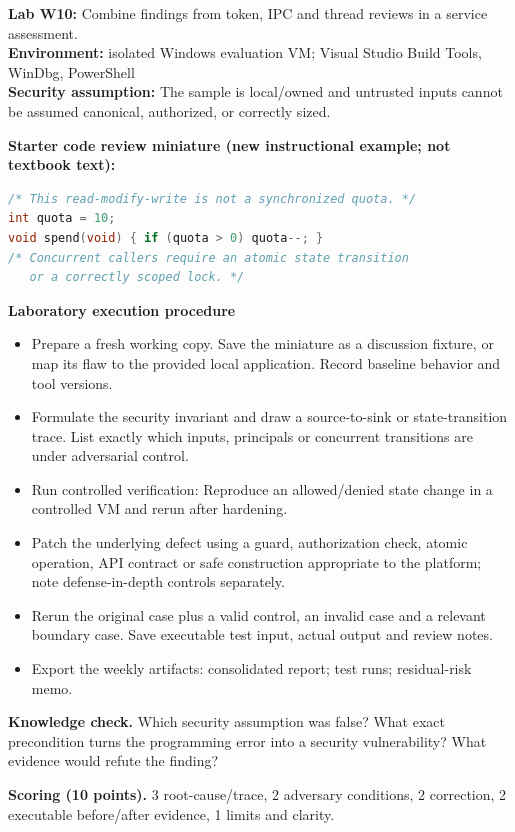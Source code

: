 \documentclass[10pt,letterpaper]{article}
\begin{document}
\begin{insight}\textbf{Lab W10:} Combine findings from token, IPC and thread reviews in a service assessment.\\\textbf{Environment:} isolated Windows evaluation VM; Visual Studio Build Tools, WinDbg, PowerShell\\\textbf{Security assumption:} The sample is local/owned and untrusted inputs cannot be assumed canonical, authorized, or correctly sized.\end{insight}
\textbf{Starter code review miniature (new instructional example; not textbook text):}
\begin{lstlisting}[language=C]
/* This read-modify-write is not a synchronized quota. */
int quota = 10;
void spend(void) { if (quota > 0) quota--; }
/* Concurrent callers require an atomic state transition
   or a correctly scoped lock. */
\end{lstlisting}
\textbf{Laboratory execution procedure}
\begin{itemize}[leftmargin=*,itemsep=2pt]
\item Prepare a fresh working copy. Save the miniature as a discussion fixture, or map its flaw to the provided local application. Record baseline behavior and tool versions.
\item Formulate the security invariant and draw a source-to-sink or state-transition trace. List exactly which inputs, principals or concurrent transitions are under adversarial control.
\item Run controlled verification: Reproduce an allowed/denied state change in a controlled VM and rerun after hardening.
\item Patch the underlying defect using a guard, authorization check, atomic operation, API contract or safe construction appropriate to the platform; note defense-in-depth controls separately.
\item Rerun the original case plus a valid control, an invalid case and a relevant boundary case. Save executable test input, actual output and review notes.
\item Export the weekly artifacts: consolidated report; test runs; residual-risk memo.
\end{itemize}
\textbf{Knowledge check.} Which security assumption was false? What exact precondition turns the programming error into a security vulnerability? What evidence would refute the finding?

\textbf{Scoring (10 points).} 3 root-cause/trace, 2 adversary conditions, 2 correction, 2 executable before/after evidence, 1 limits and clarity.
\end{document}

